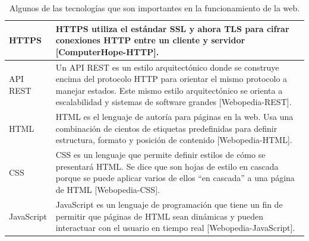\begin{table}[h!]
    \begin{tabular}{|p{}|p{}|}
        \hline
        HTTPS & HTTPS utiliza el estándar SSL y ahora TLS para cifrar conexiones HTTP entre un cliente y servidor [ComputerHope-HTTP]. \\
        \hline
        API REST & Un API REST es un estilo arquitectónico donde se construye encima del protocolo HTTP para orientar el mismo protocolo a manejar estados. Este mismo estilo arquitectónico se orienta a escalabilidad y sistemas de software grandes [Webopedia-REST]. \\
        \hline
        HTML & HTML es el lenguaje de autoría para páginas en la web. Usa una combinación de cientos de etiquetas predefinidas para definir estructura, formato y posición de contenido [Webopedia-HTML]. \\
        \hline
        CSS & CSS es un lenguaje que permite definir estilos de cómo se presentará HTML. Se dice que son hojas de estilo en cascada porque se puede aplicar varios de ellos “en cascada” a una página de HTML [Webopedia-CSS]. \\
        \hline
        JavaScript & JavaScript es un lenguaje de programación que tiene un fin de permitir que páginas de HTML sean dinámicas y pueden interactuar con el usuario en tiempo real [Webopedia-JavaScript]. \\
        \hline
    \end{tabular}
	\caption{Algunos de las tecnologías que son importantes en la funcionamiento de la web.}
    \label{tecnologias-web}
\end{table}
